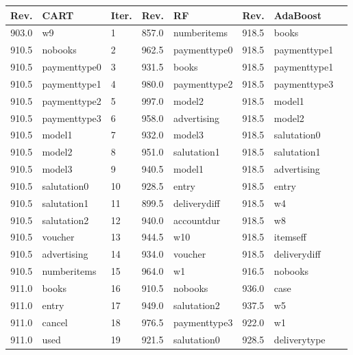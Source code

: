 

\begin{table}[]
\centering
\begin{tabular*}{\textwidth}{c @{\extracolsep{\fill}} lllllll}
\toprule
\textbf{Rev.} & \textbf{CART} & \textbf{Iter.} & \textbf{Rev.} & \textbf{RF} & \textbf{Rev.} &\textbf{AdaBoost} \\
\midrule
903.0 & w9 & 1 & 857.0 & numberitems & 918.5 & books\\
910.5 & nobooks & 2 & 962.5 & paymenttype0 & 918.5 & paymenttype1\\
910.5 & paymenttype0  & 3 & 931.5 & books & 918.5 & paymenttype1\\
910.5 & paymenttype1 & 4 & 980.0 & paymenttype2 & 918.5 & paymenttype3\\
910.5 & paymenttype2 & 5 & 997.0 & model2 & 918.5 & model1\\
910.5 & paymenttype3 & 6 & 958.0 & advertising & 918.5 & model2\\
910.5 & model1 & 7 & 932.0 & model3 & 918.5 & salutation0 \\
910.5 & model2 & 8 & 951.0 & salutation1 & 918.5 & salutation1\\
910.5 & model3 & 9 & 940.5 & model1 & 918.5 & advertising\\
910.5 & salutation0  & 10 & 928.5 & entry & 918.5 & entry\\
910.5 & salutation1 & 11 & 899.5 & deliverydiff & 918.5 & w4\\
910.5 & salutation2 & 12 & 940.0 & accountdur & 918.5 & w8\\
910.5 & voucher & 13 & 944.5 & w10 & 918.5 & itemseff\\
910.5 & advertising & 14 & 934.0 & voucher & 918.5 & deliverydiff\\
910.5 & numberitems & 15 & 964.0 & w1 & 916.5 & nobooks\\
911.0 & books & 16 & 910.5 & nobooks & 936.0 & case\\
911.0 & entry & 17 & 949.0 & salutation2 & 937.5 & w5\\
911.0 & cancel & 18 & 976.5 & paymenttype3 & 922.0 & w1\\
911.0 & used & 19 & 921.5 & salutation0  & 928.5 & deliverytype\\

\end{tabular*}
\end{table}
